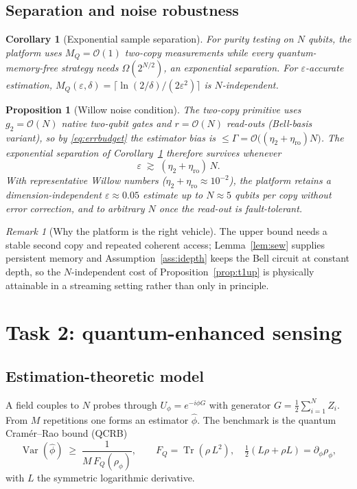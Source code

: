 \documentclass[11pt]{article}
\theoremstyle{plain}
\newtheorem{proposition}[theorem]{Proposition}
\newtheorem{corollary}[theorem]{Corollary}
\theoremstyle{definition}
\theoremstyle{remark}
\newtheorem{remark}[theorem]{Remark}
\newcommand{\Tr}{\operatorname{Tr}}
\newcommand{\Var}{\operatorname{Var}}
\newcommand{\FQ}{F_{Q}}
\newcommand{\eps}{\varepsilon}
\newcommand{\bigO}{\mathcal{O}}
\begin{document}
\subsection{Separation and noise robustness}
\begin{corollary}[Exponential sample separation]\label{cor:t1}
For purity testing on $N$ qubits, the platform uses $M_Q=\bigO(1)$ two-copy measurements while every quantum-memory-free strategy needs $\Omega(2^{N/2})$, an \emph{exponential} separation. For $\eps$-accurate estimation, $M_Q(\eps,\delta)=\lceil \ln(2/\delta)/(2\eps^2)\rceil$ is $N$-independent.
\end{corollary}

\begin{proposition}[Willow noise condition]\label{prop:t1noise}
The two-copy primitive uses $g_2=\bigO(N)$ native two-qubit gates and $r=\bigO(N)$ read-outs (Bell-basis variant), so by \eqref{eq:errbudget} the estimator bias is $\le\Gamma=\bigO\big((\eta_2+\eta_{\mathrm{ro}})N\big)$. The exponential separation of Corollary~\ref{cor:t1} therefore survives whenever
\begin{equation}
\eps\;\gtrsim\;(\eta_2+\eta_{\mathrm{ro}})\,N .
\label{eq:t1noise}
\end{equation}
With representative Willow numbers ($\eta_2+\eta_{\mathrm{ro}}\approx 10^{-2}$), the platform retains a dimension-independent $\eps\approx 0.05$ estimate up to $N\approx 5$ qubits per copy without error correction, and to arbitrary $N$ once the read-out is fault-tolerant.
\end{proposition}

\begin{remark}[Why the platform is the right vehicle]
The upper bound needs a stable second copy and repeated coherent access; Lemma~\ref{lem:sew} supplies persistent memory and Assumption~\ref{ass:idepth} keeps the Bell circuit at constant depth, so the $N$-independent cost of Proposition~\ref{prop:t1up} is physically attainable in a streaming setting rather than only in principle.
\end{remark}

\section{Task 2: quantum-enhanced sensing}\label{sec:task2}

\subsection{Estimation-theoretic model}
A field couples to $N$ probes through $U_\phi=e^{-i\phi G}$ with generator $G=\tfrac12\sum_{i=1}^N Z_i$. From $M$ repetitions one forms an estimator $\widehat\phi$. The benchmark is the quantum Cram\'er--Rao bound (QCRB)
\begin{equation}
\Var(\widehat\phi)\;\ge\;\frac{1}{M\,\FQ(\rho_\phi)},\qquad
\FQ=\Tr(\rho\,L^2),\quad \tfrac12(L\rho+\rho L)=\partial_\phi\rho_\phi,
\label{eq:qcrb}
\end{equation}
with $L$ the symmetric logarithmic derivative.
\end{document}
